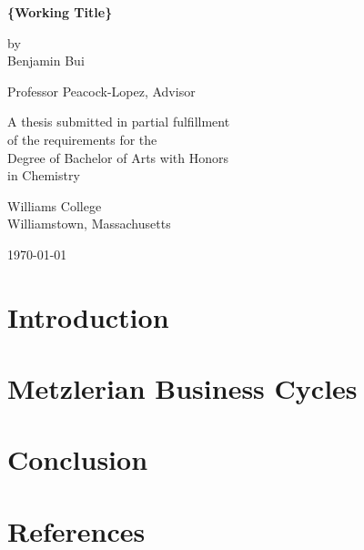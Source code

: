 \documentclass[12pt,twoside]{report}
\begin{document}
\begin{titlepage}
	\begin{center}
		\vspace*{1.5 cm}
		\textbf{\{Working Title\}}


		\vspace{1.5 cm}

		by\\ Benjamin Bui
		\vspace{1.5 cm}

		Professor Peacock-Lopez, Advisor
		\vspace{1.5 cm}

		A thesis submitted in partial fulfillment\\
		of the requirements for the\\
		Degree of Bachelor of Arts with Honors\\
		in Chemistry
		\vspace{1.5 cm}

		Williams College\\
		Williamstown, Massachusetts
		\vspace{1.5 cm}

		\today
	\end{center}
\end{titlepage}




\tableofcontents
\chapter{Introduction}

\chapter{Metzlerian Business Cycles}

\chapter{Conclusion}

\chapter{References}

\end{document}
